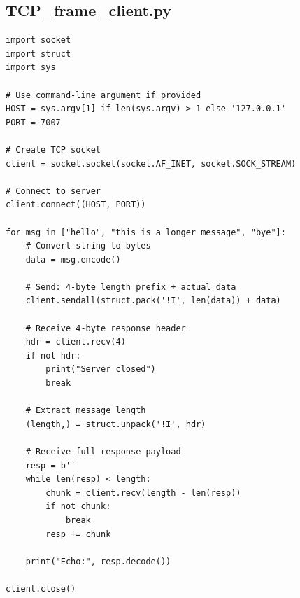 \documentclass[11pt,a4paper]{article}
\begin{document}
\subsection*{TCP\_frame\_client.py}
\begin{lstlisting}[style=labcode]
import socket
import struct
import sys

# Use command-line argument if provided
HOST = sys.argv[1] if len(sys.argv) > 1 else '127.0.0.1'
PORT = 7007

# Create TCP socket
client = socket.socket(socket.AF_INET, socket.SOCK_STREAM)

# Connect to server
client.connect((HOST, PORT))

for msg in ["hello", "this is a longer message", "bye"]:
    # Convert string to bytes
    data = msg.encode()

    # Send: 4-byte length prefix + actual data
    client.sendall(struct.pack('!I', len(data)) + data)

    # Receive 4-byte response header
    hdr = client.recv(4)
    if not hdr:
        print("Server closed")
        break

    # Extract message length
    (length,) = struct.unpack('!I', hdr)

    # Receive full response payload
    resp = b''
    while len(resp) < length:
        chunk = client.recv(length - len(resp))
        if not chunk:
            break
        resp += chunk

    print("Echo:", resp.decode())

client.close()
\end{lstlisting}
\end{document}
